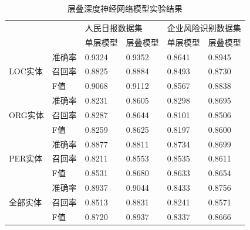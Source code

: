 \documentclass[winfonts,master,oneside,nobackinfo]{njuthesis}
\begin{document}
\begin{table}[H]
\centering
\begin{tabular}{|l|l|l|l|l|l|}
\hline
\multicolumn{2}{|l|}{\multirow{2}{*}{}} & \multicolumn{2}{l|}{人民日报数据集} & \multicolumn{2}{l|}{企业风险识别数据集} \\ \cline{3-6} 
\multicolumn{2}{|l|}{}                  & 单层模型          & 层叠模型         & 单层模型           & 层叠模型          \\ \hline
\multirow{3}{*}{LOC实体}       & 准确率      & 0.9324        & 0.9352       & 0.8641         & 0.8945        \\ \cline{2-6} 
                             & 召回率      & 0.8825        & 0.8884       & 0.8493         & 0.8730        \\ \cline{2-6} 
                             & F值       & 0.9068        & 0.9112       & 0.8567         & 0.8838        \\ \hline
\multirow{3}{*}{ORG实体}       & 准确率      & 0.8231        & 0.8605       & 0.8298         & 0.8695        \\ \cline{2-6} 
                             & 召回率      & 0.8287        & 0.8644       & 0.8101         & 0.8506        \\ \cline{2-6} 
                             & F值       & 0.8259        & 0.8625       & 0.8197         & 0.8600        \\ \hline
\multirow{3}{*}{PER实体}       & 准确率      & 0.8877        & 0.8811       & 0.8734         & 0.8699        \\ \cline{2-6} 
                             & 召回率      & 0.8211        & 0.8553       & 0.8535         & 0.8611        \\ \cline{2-6} 
                             & F值       & 0.8531        & 0.8680       & 0.8633         & 0.8654        \\ \hline
\multirow{3}{*}{全部实体}        & 准确率      & 0.8937        & 0.9044       & 0.8433         & 0.8756        \\ \cline{2-6} 
                             & 召回率      & 0.8513        & 0.8831       & 0.8241         & 0.8571        \\ \cline{2-6} 
                             & F值       & 0.8720        & 0.8937       & 0.8337         & 0.8666        \\ \hline
\end{tabular}
\caption{层叠深度神经网络模型实验结果}
\end{table}
\end{document}
